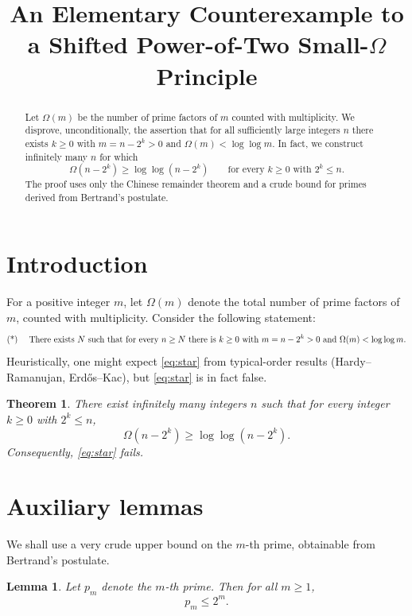 \documentclass[11pt]{article}
\title{An Elementary Counterexample to a Shifted Power-of-Two Small-$\Omega$ Principle}
\author{}
\date{}
\newtheorem{theorem}{Theorem}
\newtheorem{lemma}{Lemma}
\numberwithin{equation}{section}
\begin{document}
\maketitle

\begin{abstract}
Let $\Omega(m)$ be the number of prime factors of $m$ counted with multiplicity.
We disprove, unconditionally, the assertion that for all sufficiently large integers $n$
there exists $k\ge 0$ with $m=n-2^k>0$ and $\Omega(m)<\log\log m$.
In fact, we construct infinitely many $n$ for which
\[
\Omega(n-2^k)\ge \log\log(n-2^k)
\qquad\text{for every }k\ge 0\text{ with }2^k\le n.
\]
The proof uses only the Chinese remainder theorem and a crude bound for primes derived from
Bertrand's postulate.
\end{abstract}

\section{Introduction}

For a positive integer $m$, let $\Omega(m)$ denote the total number of prime factors of $m$,
counted with multiplicity. Consider the following statement:
\begin{equation}\label{eq:star}
\text{(*) \quad There exists }N\text{ such that for every }n\ge N\text{ there is }k\ge 0\text{ with }m=n-2^k>0
\text{ and }\Omega(m)<\log\log m.
\end{equation}
Heuristically, one might expect \eqref{eq:star} from typical-order results (Hardy--Ramanujan,
Erd\H{o}s--Kac), but \eqref{eq:star} is in fact false.

\begin{theorem}\label{thm:main}
There exist infinitely many integers $n$ such that for every integer $k\ge 0$ with $2^k\le n$,
\begin{equation}\label{eq:goal}
\Omega(n-2^k)\ge \log\log(n-2^k).
\end{equation}
Consequently, \eqref{eq:star} fails.
\end{theorem}

\section{Auxiliary lemmas}

We shall use a very crude upper bound on the $m$-th prime, obtainable from Bertrand's postulate.

\begin{lemma}\label{lem:pm_bound}
Let $p_m$ denote the $m$-th prime. Then for all $m\ge 1$,
\[
p_m\le 2^m.
\]
\end{lemma}
\end{document}
